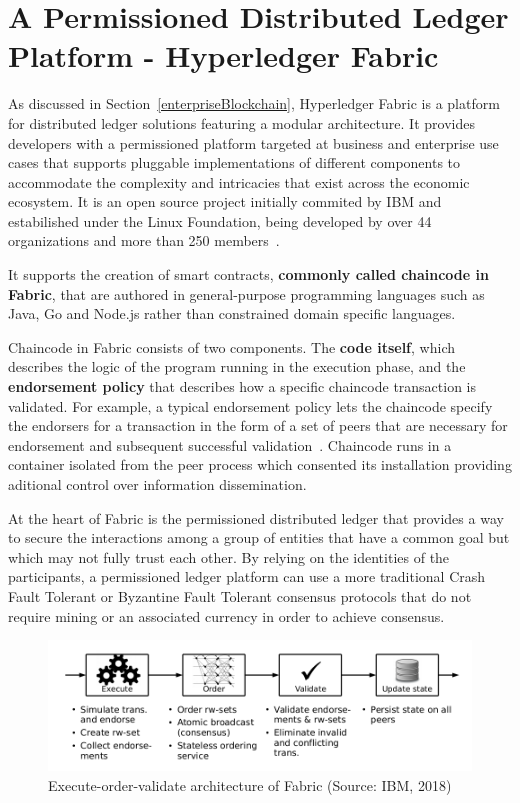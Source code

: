 \section{A Permissioned Distributed Ledger Platform - Hyperledger Fabric}
\label{distributedLedgerPlatform}

As discussed in Section~\ref{enterpriseBlockchain}, Hyperledger Fabric is a
platform for distributed ledger solutions featuring a modular architecture. It
provides developers with a permissioned platform targeted at business and
enterprise use cases that supports pluggable implementations of different
components to accommodate the complexity and intricacies that exist across the
economic ecosystem. It is an open source project initially commited by IBM  and
estabilished under the Linux Foundation, being developed by over 44
organizations and more than 250
members~\cite{HyperledgerFabricDocs2017,HyperledgerGrowth2018}.

It supports the creation of smart contracts, \textbf{commonly called chaincode
in Fabric}, that are authored in general-purpose programming languages such as
Java, Go and Node.js rather than constrained domain specific languages. 

Chaincode in Fabric consists of two components. The \textbf{code itself}, which
describes the logic of the program running in the execution phase, and the
\textbf{endorsement policy} that describes how a specific chaincode transaction
is validated. For example, a typical endorsement policy lets the chaincode
specify the endorsers for a transaction in the form of a set of peers that are
necessary for endorsement and subsequent successful
validation~\cite{Androulaki2018}. Chaincode runs in a container isolated from
the peer process which consented its installation providing aditional control
over information dissemination.

At the heart of Fabric is the permissioned distributed ledger that provides a
way to secure the interactions among a group of entities that have a common
goal but which may not fully trust each other. By relying on the identities of
the participants, a permissioned ledger platform can use a more traditional
Crash Fault Tolerant or Byzantine Fault Tolerant consensus protocols that do
not require mining or an associated currency in order to achieve consensus.

\begin{figure}[h]
  \centering
  \includegraphics[width=1\linewidth]{imgs/executeOrderValidate.png}
  \caption{\label{fig:executeorder} Execute-order-validate architecture of
  Fabric (Source: IBM, 2018)}
\end{figure}

